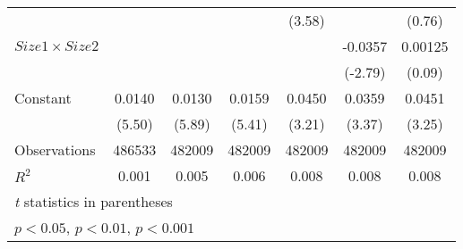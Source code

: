 {\begin{tabular}{l*{6}{c}}
                    &                     &                     &                     &      (3.58)         &                     &      (0.76)         \\
[1em]
$ Size1 \times Size2 $&                     &                     &                     &                     &     -0.0357\sym{**} &     0.00125         \\
                    &                     &                     &                     &                     &     (-2.79)         &      (0.09)         \\
[1em]
Constant            &      0.0140\sym{***}&      0.0130\sym{***}&      0.0159\sym{***}&      0.0450\sym{**} &      0.0359\sym{**} &      0.0451\sym{**} \\
                    &      (5.50)         &      (5.89)         &      (5.41)         &      (3.21)         &      (3.37)         &      (3.25)         \\
\hline
Observations        &      486533         &      482009         &      482009         &      482009         &      482009         &      482009         \\
\(R^{2}\)           &       0.001         &       0.005         &       0.006         &       0.008         &       0.008         &       0.008         \\
\hline\hline
\multicolumn{7}{l}{\footnotesize \textit{t} statistics in parentheses}\\
\multicolumn{7}{l}{\footnotesize \sym{*} \(p<0.05\), \sym{**} \(p<0.01\), \sym{***} \(p<0.001\)}\\
\end{tabular}
}
